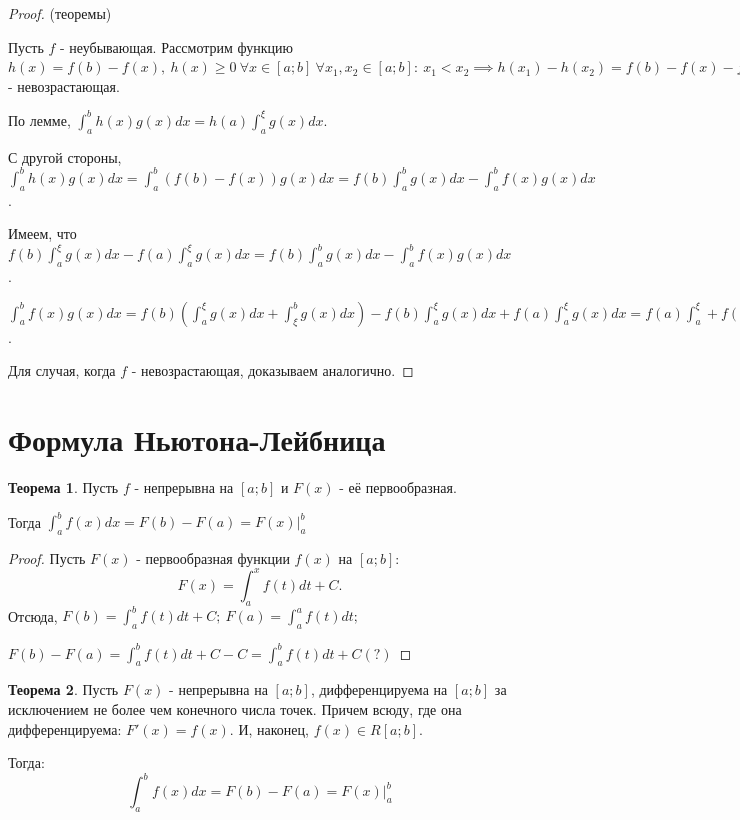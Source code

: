 \documentclass{report}
\theoremstyle{definition}
\newtheorem{theorem}{Теорема}[section]
\begin{document}
\begin{proof}
  (теоремы)

  Пусть $f$ - неубывающая. Рассмотрим функцию $h(x) = f(b) - f(x), \ h(x) \geqslant 0 \
    \forall x \in [a;b] \ \forall x_{1},x_{2} \in [a;b]: \ x_{1} < x_{2} \implies
    h(x_{1}) - h(x_{2}) = f(b) - f(x) - f(b) + f(x_{2}) = f(x_{2}) - f(x_{1}) \geqslant 0
    \implies h(x_{1}) \geqslant h(x_{2}) \implies h(x)$ - невозрастающая.

  По лемме, $\int_{a}^{b}h(x)g(x)dx = h(a)\int_{a}^{\xi}g(x)dx$.

  С другой стороны, $\int_{a}^{b}h(x)g(x)dx = \int_{a}^{b}(f(b) - f(x))g(x)dx =
    f(b)\int_{a}^{b}g(x)dx - \int_{a}^{b}f(x)g(x)dx$.

  Имеем, что $f(b)\int_{a}^{\xi}g(x)dx - f(a)\int_{a}^{\xi}g(x)dx = f(b)\int_{a}^{b}
    g(x)dx - \int_{a}^{b}f(x)g(x)dx$.

  $\int_{a}^{b}f(x)g(x)dx = f(b)(\int_{a}^{\xi}g(x)dx + \int_{\xi}^{b}g(x)dx) -
    f(b)\int_{a}^{\xi}g(x)dx + f(a)\int_{a}^{\xi}g(x)dx = f(a)\int_{a}^{\xi} +
    f(b)\int_{\xi}^{b}g(x)dx$.

  Для случая, когда $f$ - невозрастающая, доказываем аналогично.
\end{proof}

\section{Формула Ньютона-Лейбница}

\begin{theorem}
  Пусть $f$ - непрерывна на $[a;b]$ и $F(x)$ - её первообразная.

  Тогда $\int_{a}^{b}f(x)dx = F(b) - F(a) = F(x)|_{a}^{b}$
\end{theorem}

\begin{proof}
  Пусть $F(x)$ - первообразная функции $f(x)$ на $[a;b]$:
  \begin{equation*}
    F(x) = \int_{a}^{x}f(t)dt + C.
  \end{equation*}
  Отсюда, $F(b) = \int_{a}^{b}f(t)dt + C; \ F(a) = \int_{a}^{a}f(t)dt;$

  $F(b) - F(a) = \int_{a}^{b}f(t)dt + C - C = \int_{a}^{b}f(t)dt + C (?)$
\end{proof}

\begin{theorem}
  Пусть $F(x)$ - непрерывна на $[a;b]$, дифференцируема на $[a;b]$
  за исключением не более чем конечного числа точек. Причем всюду, где
  она дифференцируема: $F'(x) = f(x)$. И, наконец, $f(x)\in R[a;b]$.

  Тогда:
  \begin{equation*}
    \int_{a}^{b}f(x)dx = F(b) - F(a) = F(x)|_{a}^{b}
  \end{equation*}
\end{theorem}
\end{document}
